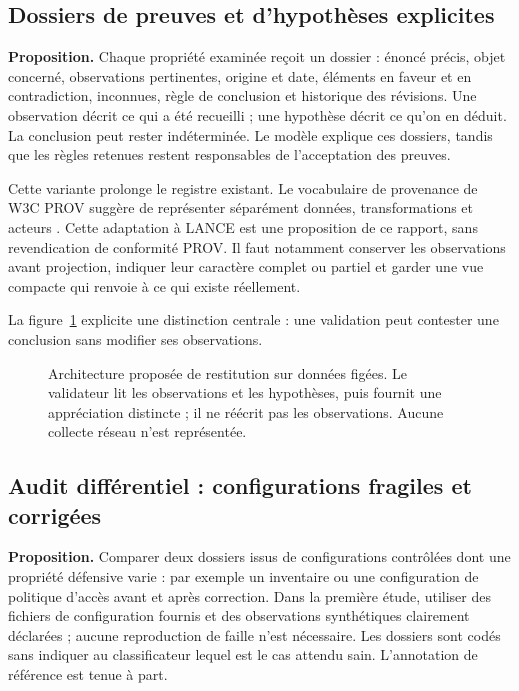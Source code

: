 \documentclass[11pt,a4paper]{article}
\begin{document}
\subsection{Dossiers de preuves et d'hypothèses explicites}
\textbf{Proposition.} Chaque propriété examinée reçoit un dossier : énoncé
précis, objet concerné, observations pertinentes, origine et date, éléments en
faveur et en contradiction, inconnues, règle de conclusion et historique des
révisions. Une observation décrit ce qui a été recueilli ; une hypothèse décrit
ce qu'on en déduit. La conclusion peut rester indéterminée. Le modèle explique
ces dossiers, tandis que les règles retenues restent responsables de
l'acceptation des preuves.

Cette variante prolonge le registre existant. Le vocabulaire de provenance
de W3C PROV suggère de représenter séparément données, transformations et
acteurs \cite{prov}. Cette adaptation à LANCE est une proposition de ce rapport,
sans revendication de conformité PROV. Il faut notamment conserver les
observations avant projection, indiquer leur caractère complet ou partiel et
garder une vue compacte qui renvoie à ce qui existe réellement.

La figure~\ref{fig:dossiers} explicite une distinction centrale : une
validation peut contester une conclusion sans modifier ses observations.

\begin{figure}[htbp]
\centering
{}
\caption{Architecture proposée de restitution sur données figées. Le validateur
lit les observations et les hypothèses, puis fournit une appréciation distincte ;
il ne réécrit pas les observations. Aucune collecte réseau n'est représentée.}
\label{fig:dossiers}
\end{figure}

\subsection{Audit différentiel : configurations fragiles et corrigées}
\textbf{Proposition.} Comparer deux dossiers issus de configurations contrôlées
dont une propriété défensive varie : par exemple un inventaire ou une
configuration de politique d'accès avant et après correction. Dans la première
étude, utiliser des fichiers de configuration fournis et des observations
synthétiques clairement déclarées ; aucune reproduction de faille n'est
nécessaire. Les dossiers sont codés sans indiquer au classificateur lequel est
le cas attendu sain. L'annotation de référence est tenue à part.
\end{document}
